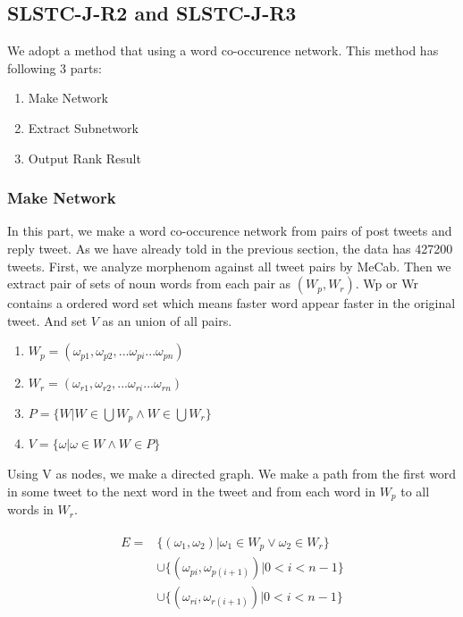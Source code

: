 \documentclass{../style/sig-alternate}
\begin{document}
\subsection{SLSTC-J-R2 and SLSTC-J-R3}
We adopt a method that using a word co-occurence network.
This method has following 3 parts:
\begin{enumerate}
    \item Make Network
    \item Extract Subnetwork
    \item Output Rank Result
\end{enumerate} 

\subsubsection{Make Network}
In this part, we make a word co-occurence network from pairs of post tweets and reply tweet.
As we have already told in the previous section, the data has 427200 tweets. 
First, we analyze morphenom against all tweet pairs by MeCab. Then we extract pair of sets of noun words from each pair as \((W_{p}, W_{r})\). Wp or Wr contains a ordered word set which means faster word appear faster in the original tweet. And set \(V\) as an union of all pairs.

\begin{enumerate}
    \item \(W_{p} = (\omega_{p1}, \omega_{p2}, ... \omega_{pi} ... \omega_{pn}) \)
    \item \(W_{r} = (\omega_{r1}, \omega_{r2}, ... \omega_{ri} ... \omega_{rn}) \)
    \item \(P = \{W | W \in \bigcup W_{p} \wedge W \in \bigcup W_{r}\}\)
    \item \(V = \{\omega | \omega \in W \wedge W \in P\} \)
\end{enumerate}

Using V as nodes, we make a directed graph. We make a path from the first word in some tweet to the next word in the tweet and from each word in \( W_{p} \) to all words in \(W_{r} \).

\begin{eqnarray}
\begin{split}
E = &\{(\omega_{1}, \omega_{2}) | \omega_{1}\in W_{p} \lor \omega_{2}\in W_{r}\}\\
&\cup \{(\omega_{pi}, \omega_{p(i+1)}) | 0 < i < n-1\}\\
&\cup \{(\omega_{ri}, \omega_{r(i+1)}) | 0 < i < n-1\}
\end{split}
\end{eqnarray}
\end{document}
